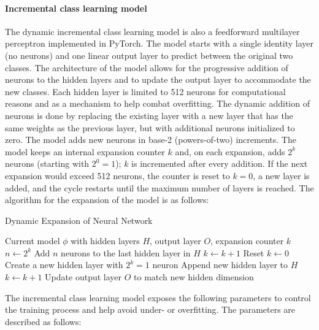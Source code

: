 \documentclass[conference]{IEEEtran}
\begin{document}
\paragraph{Incremental class learning model}
The dynamic incremental class learning model is also a feedforward multilayer perceptron implemented in PyTorch. The model starts with a single identity layer (no neurons) and one linear output layer to predict between the original two classes. The architecture of 
the model allows for the progressive addition of neurons to the hidden layers and to update the output layer to accommodate the new classes. Each hidden layer is limited to 512 neurons for computational reasons and as a mechanism to 
help combat overfitting. The dynamic addition of neurons is done by replacing the existing layer with a new layer that has the same weights as the previous layer, but with additional neurons initialized to zero. The model adds new 
neurons in base-2 (powers-of-two) increments. The model keeps an internal expansion counter $k$ and, on each expansion, adds $2^k$ neurons (starting with $2^0=1$); $k$ is incremented after every addition. If the next expansion would exceed 512 neurons, the counter is reset to $k=0$, a new layer is added, and the cycle restarts until the maximum number of layers is reached. The algorithm for the expansion of the model is as follows:
\begin{algorithm}[H]
\caption{Dynamic Expansion of Neural Network}
\begin{algorithmic}[1]
\REQUIRE Current model $\phi$ with hidden layers $H$, output layer $O$, expansion counter $k$
\STATE $n \gets 2^k$ 
    \STATE Add $n$ neurons to the last hidden layer in $H$
    \STATE $k \gets k+1$
\ELSE
    \STATE Reset $k \gets 0$
    \STATE Create a new hidden layer with $2^k = 1$ neuron
    \STATE Append new hidden layer to $H$
    \STATE $k \gets k+1$
\ENDIF
\STATE Update output layer $O$ to match new hidden dimension
\end{algorithmic}
\end{algorithm}
The incremental class learning model exposes the following parameters to control the training process and help avoid under- or overfitting. The parameters are described as follows:
\end{document}
